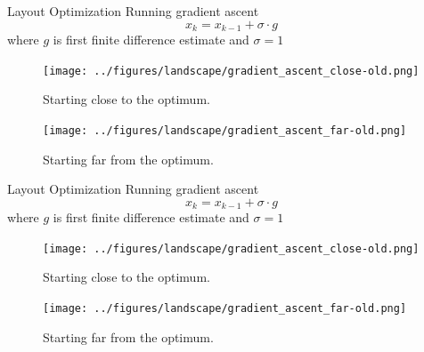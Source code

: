 \documentclass[10pt, xcolor={dvipsnames}]{beamer}
\begin{document}
\begin{frame}{Layout Optimization}
Running gradient ascent
\begin{equation}
x_{k} = x_{k - 1} + \sigma \cdot g
\end{equation}
where $g$ is first finite difference estimate and $\sigma = 1$
\begin{minipage}[t]{0.5\textwidth}
\begin{center}
\begin{figure}
\texttt{[image: ../figures/landscape/gradient\_ascent\_close-old.png]}
\caption{Starting close to the optimum.}
\end{figure}
\end{center}
\end{minipage}%
\begin{minipage}[t]{0.5\textwidth}
\vspace{0.1cm}
\begin{center}
\begin{figure}
\texttt{[image: ../figures/landscape/gradient\_ascent\_far-old.png]}
\caption{Starting far from the optimum.}
\end{figure}
\end{center}
\end{minipage}
\end{frame}

\begin{frame}{Layout Optimization}
Running gradient ascent
\begin{equation}
x_{k} = x_{k - 1} + \sigma \cdot g
\end{equation}
where $g$ is first finite difference estimate and $\sigma = 1$
\begin{minipage}[t]{0.5\textwidth}
\begin{center}
\begin{figure}
\texttt{[image: ../figures/landscape/gradient\_ascent\_close-old.png]}
\caption{Starting close to the optimum.}
\end{figure}
\end{center}
\end{minipage}%
\begin{minipage}[t]{0.5\textwidth}
\vspace{0.1cm}
\begin{center}
\begin{figure}
\texttt{[image: ../figures/landscape/gradient\_ascent\_far-old.png]}
\caption{Starting far from the optimum.}
\end{figure}
\end{center}
\end{minipage}
\end{frame}
\end{document}
